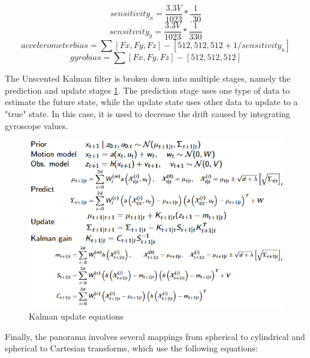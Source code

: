 \documentclass[a4paper]{article}
\begin{document}
\begin{equation*}\label{eq:sensa_bias}
sensitivity_a = \frac{3.3 V}{1023} * \frac{1}{.30}
\end{equation*}
\begin{equation*}\label{eq:sensg_bias}
sensitivity_g = \frac{3.3 V}{1023} * \frac{1}{330}
\end{equation*}
\begin{equation*}\label{eq:accel_bias}
accelerometerbias = \sum{[Fx,Fy,Fz]} - [512,512,512 + 1 / sensitivity_a]
\end{equation*}
\begin{equation*}\label{eq:gyro_bias}
gyrobias			=\sum{[Fx,Fy,Fz]} - [512,512,512]
\end{equation*}
    
    The Unscented Kalman filter is broken down into multiple stages, namely the prediction and update stages \ref{fig:kalman_eq}. The prediction stage uses one type of data to estimate the future state, while the update state uses other data to update to a "true" state. In this case, it is used to decrease the drift caused by integrating gyroscope values.
    
\begin{figure}[h]
  \centering
    \includegraphics[width=1\textwidth]{kalman_eq.png}
  \caption{Kalman update equations\label{fig:kalman_eq}}
\end{figure}
    
    Finally, the panorama involves several mappings from spherical to cylindrical and spherical to Cartesian transforms, which use the following equations:
    
\end{document}
